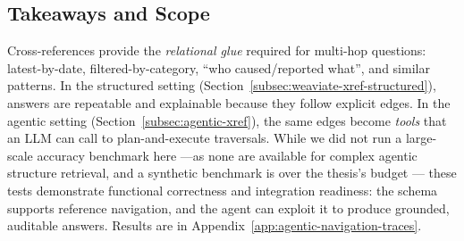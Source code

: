 \subsection{Takeaways and Scope}
Cross-references provide the \emph{relational glue} required for multi-hop questions: latest-by-date, filtered-by-category, \enquote{who caused/reported what}, and similar patterns. In the structured setting (Section~\ref{subsec:weaviate-xref-structured}), answers are repeatable and explainable because they follow explicit edges. In the agentic setting (Section~\ref{subsec:agentic-xref}), the same edges become \emph{tools} that an \gls{LLM} can call to plan-and-execute traversals. While we did not run a large-scale accuracy benchmark here ---as none are available for complex agentic structure retrieval, and a synthetic benchmark is over the thesis's budget --- these tests demonstrate functional correctness and integration readiness: the schema supports reference navigation, and the agent can exploit it to produce grounded, auditable answers. Results are in Appendix~\ref{app:agentic-navigation-traces}.




